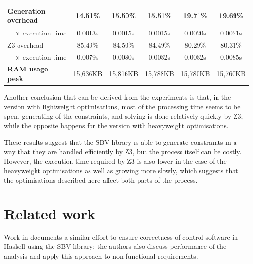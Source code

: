 \documentclass[english,runningheads]{llncs}
\begin{document}
\begin{table}[]
{\begin{tabular}{l||lllll}
Generation overhead                    & \multicolumn{1}{c|}{14.51\%}  & \multicolumn{1}{c|}{15.50\%}  & \multicolumn{1}{c|}{15.51\%}  & \multicolumn{1}{c|}{19.71\%}  & \multicolumn{1}{c}{19.69\%} \\ \hline
\multicolumn{1}{r||}{× execution time} & \multicolumn{1}{c|}{0.0013s}  & \multicolumn{1}{c|}{0.0015s}  & \multicolumn{1}{c|}{0.0015s}  & \multicolumn{1}{c|}{0.0020s}  & \multicolumn{1}{c}{0.0021s} \\ \hline
Z3 overhead                            & \multicolumn{1}{c|}{85.49\%}  & \multicolumn{1}{c|}{84.50\%}  & \multicolumn{1}{c|}{84.49\%}  & \multicolumn{1}{c|}{80.29\%}  & \multicolumn{1}{c}{80.31\%} \\ \hline
\multicolumn{1}{r||}{× execution time} & \multicolumn{1}{c|}{0.0079s}  & \multicolumn{1}{c|}{0.0080s}  & \multicolumn{1}{c|}{0.0082s}  & \multicolumn{1}{c|}{0.0082s}  & \multicolumn{1}{c}{0.0085s} \\ \hline
\textbf{RAM usage peak}                & \multicolumn{1}{c|}{15,636KB} & \multicolumn{1}{c|}{15,816KB} & \multicolumn{1}{c|}{15,788KB} & \multicolumn{1}{c|}{15,780KB} & \multicolumn{1}{c}{15,760KB}
\end{tabular}
}
\vspace*{-0.6cm}
\end{table}


\noindent

Another conclusion that can be derived from the experiments is that, in the
version with lightweight optimisations, most of the processing time seems to be
spent generating of the constraints, and solving is done relatively
quickly by Z3; while the opposite happens for the version with heavyweight
optimisations.

These results suggest that the SBV library is able to generate constraints in a way
that they are handled efficiently by Z3, but the process itself can be costly. However, the  execution time required by Z3
is also lower in the case of the heavyweight optimisations as well as
growing more slowly, which suggests that the optimisations described here
affect both parts of the process.

\section{Related work}

Work in \cite{mokhov2019formal} documents a similar effort to ensure
correctness of control software in Haskell using the SBV library; the
authors also discuss performance of the analysis and apply this approach
to non-functional requirements.
\end{document}
